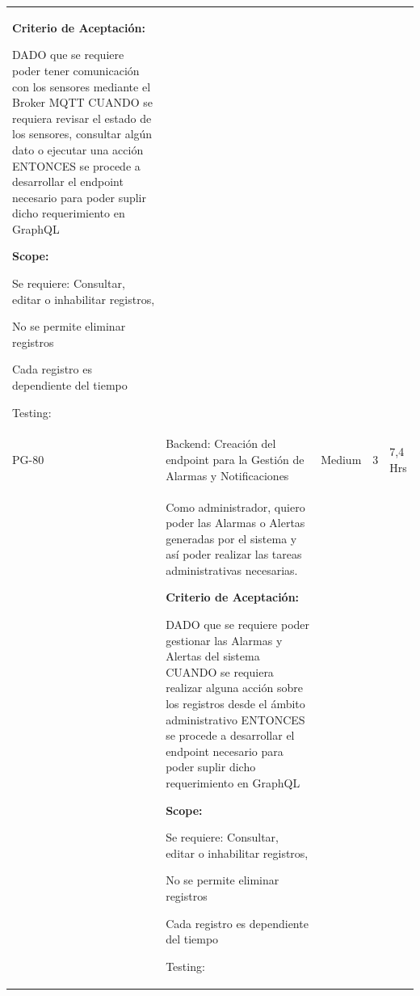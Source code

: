 \documentclass[11pt]{charter}
\begin{document}
\begin{landscape}
\begin{tabularx}{\linewidth}{@{}|p{1.3cm}|p{17cm}|p{1.7cm}|p{1.5cm}|p{1.7cm}|@{}}
\begin{description}
                   \item \textbf{Criterio de Aceptación:}                 
                   \item DADO que se requiere poder tener comunicación con los sensores mediante el   Broker MQTT CUANDO se requiera revisar el estado de los sensores, consultar algún dato   o ejecutar una acción ENTONCES se procede a desarrollar el endpoint necesario para poder suplir dicho requerimiento en GraphQL                
                   \item \textbf{Scope:}                  
                         \item Se requiere: Consultar, editar o inhabilitar registros, 
                         \item No se permite eliminar registros 
                         \item Cada registro es dependiente del tiempo                 
                   \item Testing:
            \end{description}        &  &     & \\
PG-80    & Backend: Creación del endpoint   para la Gestión de Alarmas y Notificaciones         & Medium             & 3   & 7,4  Hrs          \\
         &  \begin{description}                 
                   \item Como administrador, quiero poder   las Alarmas o Alertas generadas por el sistema y así poder realizar las   tareas administrativas necesarias.                 
                   \item \textbf{Criterio de Aceptación:}                 
                   \item DADO que se requiere poder gestionar las Alarmas y Alertas del   sistema CUANDO se requiera realizar alguna acción sobre los registros desde el   ámbito administrativo ENTONCES se procede a desarrollar el endpoint necesario para poder suplir dicho requerimiento en GraphQL                
                   \item \textbf{Scope:}                  
                         \item Se requiere: Consultar, editar o inhabilitar registros, 
                         \item No se permite eliminar registros 
                         \item Cada registro es dependiente del tiempo                 
                   \item Testing:

\end{description}
\end{tabularx}
\end{landscape}
\end{document}

